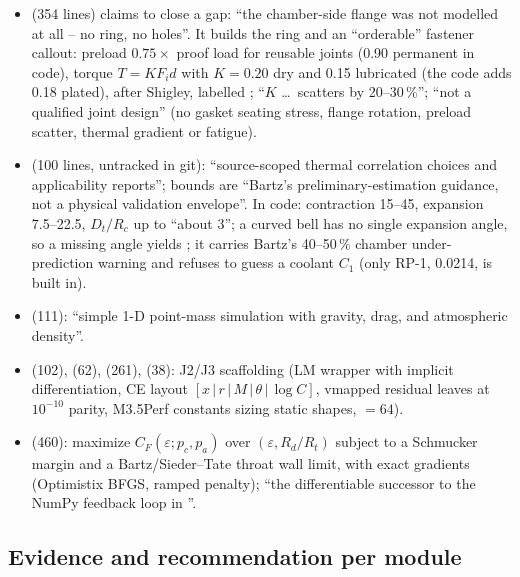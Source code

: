 \begin{itemize}
\item {} (354 lines) claims to close a gap: ``the chamber-side flange was not modelled at all -- no ring, no holes''. It builds the ring and an ``orderable'' fastener callout: preload $0.75\times$ proof load for reusable joints (0.90 permanent in code), torque $T=KF_id$ with $K=0.20$ dry and 0.15 lubricated (the code adds 0.18 plated), after Shigley, labelled ; ``$K$ \ldots\ scatters by 20--30\,\%''; ``not a qualified joint design'' (no gasket seating stress, flange rotation, preload scatter, thermal gradient or fatigue).
\item {} (100 lines, untracked in git): ``source-scoped thermal correlation choices and applicability reports''; bounds are ``Bartz's preliminary-estimation guidance, not a physical validation envelope''. In code: contraction 15--45\textdegree, expansion 7.5--22.5\textdegree, $D_t/R_c$ up to ``about 3''; a curved bell has no single expansion angle, so a missing angle yields ; it carries Bartz's 40--50\,\% chamber under-prediction warning and refuses to guess a coolant $C_1$ (only RP-1, 0.0214, is built in).
\item {} (111): ``simple 1-D point-mass simulation with gravity, drag, and atmospheric density''.
\item {} (102),  (62),  (261),  (38): J2/J3 scaffolding (LM wrapper with implicit differentiation, CE layout $[x\,|\,r\,|\,M\,|\,\theta\,|\,\log C]$, vmapped residual leaves at $10^{-10}$ parity, M3.5Perf constants sizing static shapes,  $=64$).
\item {} (460): maximize $C_F(\varepsilon;p_c,p_a)$ over $(\varepsilon,R_d/R_t)$ subject to a Schmucker margin and a Bartz/Sieder--Tate throat wall limit, with exact gradients (Optimistix BFGS, ramped penalty); ``the differentiable successor to the NumPy feedback loop in ''.
\end{itemize}

\subsection{Evidence and recommendation per module}

